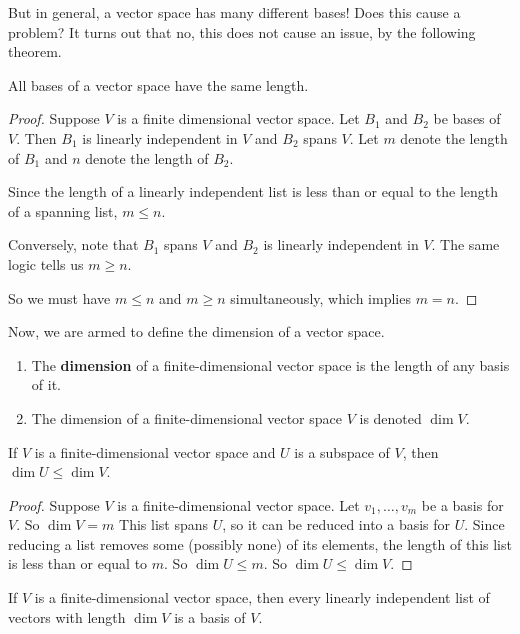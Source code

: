 But in general, a vector space has many different bases! Does this cause a problem? It turns out that no, this does not cause an issue, by the following theorem.
\begin{theorem}
    All bases of a vector space have the same length.
\end{theorem}
\begin{proof}
    Suppose $V$ is a finite dimensional vector space. Let $B_1$ and $B_2$ be bases of $V$. Then $B_1$ is linearly independent in $V$ and $B_2$ spans $V$. Let $m$ denote the length of $B_1$ and $n$ denote the length of $B_2$. 
    
    Since the length of a linearly independent list is less than or equal to the length of a spanning list, $m\le n$.

    Conversely, note that $B_1$ spans $V$ and $B_2$ is linearly independent in $V$. The same logic tells us $m\ge n$.

    So we must have $m\le n$ and $m \ge n$ simultaneously, which implies $m=n$.
\end{proof}
Now, we are armed to define the dimension of a vector space.
\begin{definition}[Dimension]
    \begin{enumerate}
        \item The \textbf{dimension} of a finite-dimensional vector space is the length of any basis of it.
        \item The dimension of a finite-dimensional vector space $V$ is denoted $\dim V$.
    \end{enumerate}
\end{definition}
\begin{theorem}
    If $V$ is a finite-dimensional vector space and $U$ is a subspace of $V$, then $\dim U \le \dim V$.
\end{theorem}
\begin{proof}
    Suppose $V$ is a finite-dimensional vector space. Let $v_1, \dots, v_m$ be a basis for $V$. So $\dim V = m$ This list spans $U$, so it can be reduced into a basis for $U$. Since reducing a list removes some (possibly none) of its elements, the length of this list is less than or equal to $m$. So $\dim U \le m$. So $\dim U \le \dim V$.
\end{proof}
\begin{theorem}
    If $V$ is a finite-dimensional vector space, then every linearly independent list of vectors with length $\dim V$ is a basis of $V$.
\end{theorem}
